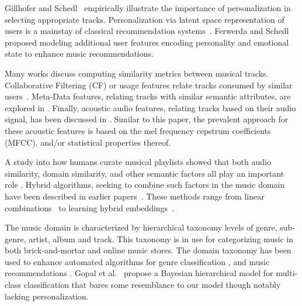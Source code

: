 Gillhofer and Schedl~\cite{Gillhofer2015} empirically illustrate the importance of personalization in selecting appropriate tracks. Personalization via latent space representation of users is a mainstay of classical recommendation systems~\cite{KorenBV09}. Ferwerda and Schedl~\cite{personalized_playlist_schedl} proposed modeling additional user features encoding personality and emotional state to enhance music recommendations.


Many works discuss computing similarity metrics between musical tracks. Collaborative Filtering (CF) or usage features relate tracks consumed by similar users~\cite{item2vec,Dror2011,Mcfee_learningsimilarity_CF}. Meta-Data features, relating tracks with similar semantic attributes, are explored in \cite{Bogdanov_content,  McfeeEtAl_2009_HeteEmbeForSubj, Pauws:ISMIR02,SlaneyEtAl_2008_LearAMetrFor}. Finally, acoustic audio features, relating tracks based on their audio signal, has been discussed in \cite{DoplerEtAl_2008_AcceMusiCollVia, Lee2011,a2mf}. Similar to this paper, the prevalent approach for these acoustic features is based on the mel frequency cepstrum coefficients (MFCC), and/or statistical properties thereof.

A study into how humans curate musical playlists showed that both audio similarity, domain similarity, and other semantic factors all play an important role \cite{Cunningham:06}. 
Hybrid algorithms, seeking to combine such factors in the music domain have been described in earlier papers~\cite{Knees:2006, Mcfee_learningsimilarity_CF,McFee_multi_similarities,Schedl:2015}. These methods range from linear combinations~\cite{Knees:2006} to learning hybrid embeddings~\cite{McFee_multi_similarities}.


The music domain is characterized by hierarchical taxonomy levels of genre, sub-genre, artist, album and track. This taxonomy is in use for categorizing music in both brick-and-mortar and online music stores. The domain taxonomy has been used to enhance automated algorithms for genre classification \cite{DecoroEtAl_2007_BayeAggrForHier}, and music recommendations \cite{Dror2011,Mnih2012}.
Gopal et al.~\cite{NIPS2012_4609} propose a Bayesian hierarchical model for multi-class classification that bares some resemblance to our model though notably lacking personalization.



